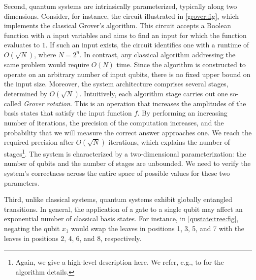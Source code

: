 Second, quantum systems are intrinsically parameterized, typically along two dimensions.
%
Consider, for instance, the circuit illustrated in \cref{grover:fig}, which implements the classical Grover’s algorithm.
%
This circuit accepts a Boolean function with $n$ input variables and aims to find an input for which the function evaluates to $1$.
%
If such an input exists, the circuit identifies one with a runtime of $O(\sqrt{N})$, where $N = 2^n$.
%
In contrast, any classical algorithm addressing the same problem would require $O(N)$ time.
%
Since the algorithm is constructed to operate on an arbitrary number of input qubits, there is no fixed upper bound on the input size.
%
Moreover, the system architecture comprises several stages, determined by $O(\sqrt{N})$.
%
Intuitively, each algorithm stage carries out one so-called {\it Grover rotation}.
%
This is an operation that increases the amplitudes of the basis states that satisfy the input function $f$.
%
By performing an increasing number of iterations, the precision of the computation increases, and the probability that we will measure the correct answer approaches one.
%
We reach the required precision after $O(\sqrt{N})$ iterations, which explains the number of stages\footnote{Again, we give a high-level description here. We refer, e.g., to \cite{10.5555/1408782} for the algorithm details.}.
%
The system is characterized by a two-dimensional parameterization: the number of qubits and the number of stages are unbounded.
%
We need to verify the system’s correctness across the entire space of possible values for these two parameters.
%

Third, unlike classical systems, quantum systems exhibit globally entangled transitions.
%
In general, the application of a gate to a single qubit may affect an exponential number of classical basis states. 
%
For instance, in \cref{qustate:tree:fig}, negating the qubit $x_1$ would swap the leaves in positions 1, 3, 5, and 7 with the leaves in positions 2, 4, 6, and 8, respectively.
%

